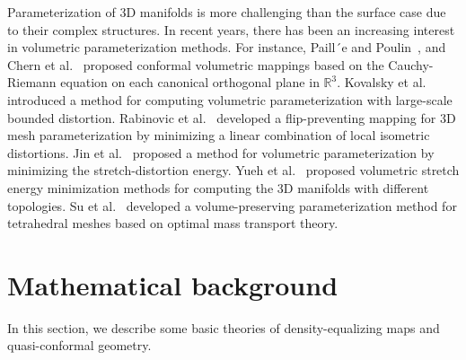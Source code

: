\documentclass{article}
\begin{document}
Parameterization of 3D manifolds is more challenging than the surface case due to their complex structures. In recent years, there has been an increasing interest in volumetric parameterization methods. For instance,  Paill´e and Poulin~\cite{paille2012conformal}, and Chern et al.~\cite{chern2015close} proposed conformal volumetric mappings based on the Cauchy-Riemann equation on each canonical orthogonal plane in $\mathbb R^3$. Kovalsky et al.~\cite{kovalsky2015large} introduced a method for computing volumetric parameterization with large-scale bounded distortion. Rabinovic et al.~\cite{rabinovich2017scalable} developed a flip-preventing mapping for 3D mesh parameterization by minimizing a linear combination of local isometric distortions. Jin et al.~\cite{jin2015stretch} proposed a method for volumetric parameterization by minimizing the stretch-distortion energy. Yueh et al.~\cite{yueh2019novel,yueh2020new} proposed volumetric stretch energy minimization methods for computing the 3D manifolds with different topologies. Su et al.~\cite{su2017volume} developed a volume-preserving parameterization method for tetrahedral meshes based on optimal mass transport theory. 


\section{Mathematical background}\label{sec:background}
In this section, we describe some basic theories of density-equalizing maps and quasi-conformal geometry.
\end{document}
